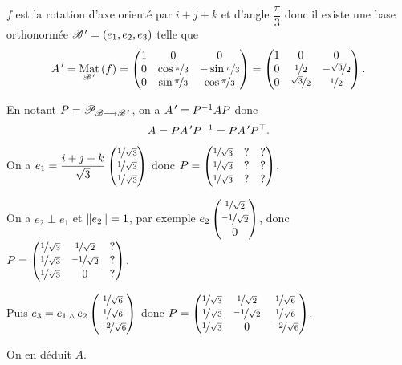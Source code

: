 \begin{corr}
\(f\) est la rotation d'axe orienté par \(i+j+k\) et d'angle \(\dfrac{\pi}{3}\) donc il existe une base orthonormée \(\mathscr{B}^{\,\prime}=\left(e_1,e_2,e_3\right)\) telle que \[A\prim=\Mat[\fami{B}\prim]{f}=\begin{pmatrix}
1 & 0 & 0 \\
0 & \cos\nicefrac{\pi}{3} & -\sin\nicefrac{\pi}{3} \\
0 & \sin\nicefrac{\pi}{3} & \cos\nicefrac{\pi}{3}
\end{pmatrix}=\begin{pmatrix}
1 & 0 & 0 \\
0 & \nicefrac{1}{2} & -\nicefrac{\sqrt{3}}{2} \\
0 & \nicefrac{\sqrt{3}}{2} & \nicefrac{1}{2}
\end{pmatrix}.\]

En notant \(P=\mathscr{P}_{\mathscr{B}\longrightarrow\mathscr{B}^{\,\prime}}\), on a \(A^{\,\prime}=P^{-1} AP\) donc \[A=PA^{\,\prime} P^{-1}=PA^{\,\prime}P^{\top}.\]

On a \(e_1=\dfrac{i+j+k}{\sqrt{3}}\begin{pmatrix}\nicefrac{1}{\sqrt{3}}\\\nicefrac{1}{\sqrt{3}}\\\nicefrac{1}{\sqrt{3}}\end{pmatrix}\) donc \(P=\begin{pmatrix}
\nicefrac{1}{\sqrt{3}} & ? & ? \\
\nicefrac{1}{\sqrt{3}} & ? & ? \\
\nicefrac{1}{\sqrt{3}} & ? & ?
\end{pmatrix}\).

On a \(e_2\perp e_1\) et \(\norme{e_2}=1\), par exemple \(e_2\begin{pmatrix}\nicefrac{1}{\sqrt{2}}\\\nicefrac{-1}{\sqrt{2}}\\0\end{pmatrix}\), donc \(P=\begin{pmatrix}
\nicefrac{1}{\sqrt{3}} & \nicefrac{1}{\sqrt{2}} & ? \\
\nicefrac{1}{\sqrt{3}} & \nicefrac{-1}{\sqrt{2}} & ? \\
\nicefrac{1}{\sqrt{3}} & 0 & ?
\end{pmatrix}\).

Puis \(e_3=e_1\operatorname{_\wedge} e_2\begin{pmatrix}\nicefrac{1}{\sqrt{6}}\\\nicefrac{1}{\sqrt{6}}\\\nicefrac{-2}{\sqrt{6}}\end{pmatrix}\) donc \(P=\begin{pmatrix}
\nicefrac{1}{\sqrt{3}} & \nicefrac{1}{\sqrt{2}} & \nicefrac{1}{\sqrt{6}} \\
\nicefrac{1}{\sqrt{3}} & \nicefrac{-1}{\sqrt{2}} & \nicefrac{1}{\sqrt{6}} \\
\nicefrac{1}{\sqrt{3}} & 0 & \nicefrac{-2}{\sqrt{6}}
\end{pmatrix}\).

On en déduit \(A\).
\end{corr}


